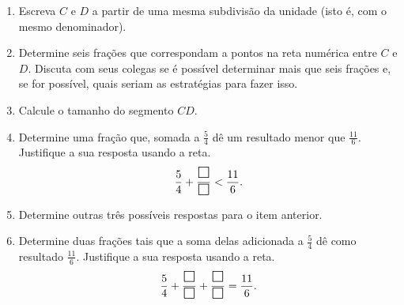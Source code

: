 \begin{atividade}{}
\begin{enumerate}  %
  \item     Escreva $C$ e $D$ a partir de uma mesma subdivisão da unidade (isto é, com o mesmo denominador).
  \item     Determine seis frações que correspondam a pontos na reta numérica entre $C$ e $D$. \newline
  Discuta com seus colegas se é possível determinar mais que seis frações e, se for possível, quais seriam as estratégias para fazer isso.
  \item     Calcule o tamanho do segmento     $CD$.
  \item     Determine uma fração que, somada a     $\frac{5}{4}$     dê um resultado menor que     $\frac{11}{6}$. Justifique a sua resposta usando a reta.     $$ \dfrac{5}{4} +\dfrac{\text{\Large $\square$}}{\text{\Large $\square$}} < \dfrac{11}{6}.$$
  \item     Determine outras três possíveis respostas para o item anterior.
  \item     Determine duas frações tais que a soma delas adicionada a $\frac{5}{4}$ dê como resultado $\frac{11}{6}$.
   Justifique a sua resposta usando a reta.     
   \[ \dfrac{5}{4} +\dfrac{\text{\Large $\square$}}{\text{\Large $\square$}} + \dfrac{\text{\Large $\square$}}{\text{\Large $\square$}} = \dfrac{11}{6}.\]
\end{enumerate} %
\end{atividade}

